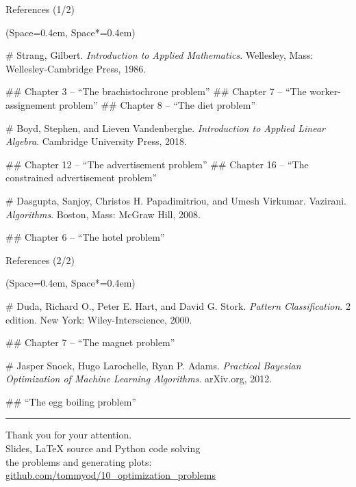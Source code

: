 \documentclass[11pt, aspectratio=149]{beamer}
\newcommand{\listSpace}{0.4em}
\theoremstyle{plain}
\begin{document}
\begin{frame}[fragile, t]{References (1/2)}
	\vspace{1em}
	\small
	\begin{easylist}[itemize]
		\ListProperties(Space=\listSpace, Space*=\listSpace)
		
		# Strang, Gilbert. \emph{Introduction to Applied Mathematics}. Wellesley, Mass: Wellesley-Cambridge Press, 1986.
		 
		## Chapter 3 -- ``The brachistochrone problem''
		## Chapter 7 -- ``The worker-assignement problem''
		## Chapter 8 -- ``The diet problem''
		
		# Boyd, Stephen, and Lieven Vandenberghe. \emph{Introduction to Applied Linear Algebra}. Cambridge University Press, 2018.
		 
		## Chapter 12 -- ``The advertisement problem''
		## Chapter 16 -- ``The constrained advertisement problem''
		
		# Dasgupta, Sanjoy, Christos H. Papadimitriou, and Umesh Virkumar. Vazirani. \emph{Algorithms}. Boston, Mass: McGraw Hill, 2008.
		
		## Chapter 6 -- ``The hotel problem''
		
	\end{easylist}
	\normalsize
\end{frame}

\begin{frame}[fragile, t]{References (2/2)}
	\vspace{1em}
	\small
	\begin{easylist}[itemize]
		\ListProperties(Space=\listSpace, Space*=\listSpace)
		
		
		# Duda, Richard O., Peter E. Hart, and David G. Stork. \emph{Pattern Classification}. 2 edition. New York: Wiley-Interscience, 2000.
		
		## Chapter 7 -- ``The magnet problem''
		
		# Jasper Snoek, Hugo Larochelle, Ryan P. Adams. \emph{Practical Bayesian Optimization of Machine Learning Algorithms}. arXiv.org, 2012.
		
		## ``The egg boiling problem''
	\end{easylist}
	\normalsize
	\vspace*{1em}
	\hrule
	
\begin{center}
	
	{\Large Thank you for your attention.} \\
	\vspace*{1em}
	Slides, \LaTeX{} source and Python code solving \\the problems and generating plots: \\
	\vspace*{1em}
	\url{github.com/tommyod/10_optimization_problems}
\end{center}
\end{frame}
\end{document}
